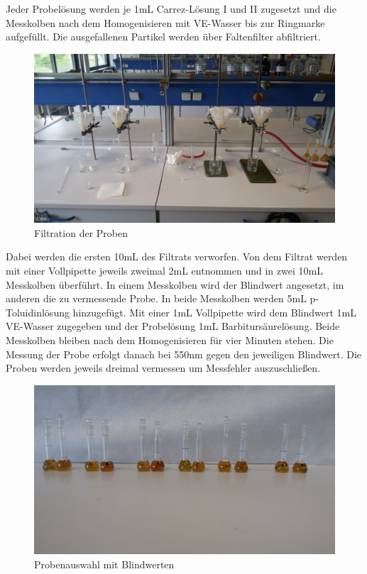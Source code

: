 Jeder Probelösung werden je 1mL Carrez-Lösung I und II zugesetzt und die Messkolben nach dem Homogenisieren mit VE-Wasser bis zur Ringmarke aufgefüllt. Die ausgefallenen Partikel werden über Faltenfilter abfiltriert. \\
\begin{figure}[htbp]
	\centering
		\includegraphics[width=1.00\textwidth]{../Bilder/20150427_131648.jpg}
	\caption{Filtration der Proben}
	\label{fig:Filtration}
\end{figure}
Dabei werden die ersten 10mL des Filtrats verworfen. Von dem Filtrat werden mit einer Vollpipette jeweils zweimal 2mL entnommen und in zwei 10mL Messkolben überführt. In einem Messkolben wird der Blindwert angesetzt, im anderen die zu vermessende Probe. In beide Messkolben werden 5mL p-Toluidinlösung hinzugefügt. Mit einer 1mL Vollpipette wird dem Blindwert 1mL VE-Wasser zugegeben und der Probelösung 1mL Barbitursäurelösung. Beide Messkolben bleiben nach dem Homogenisieren für vier Minuten stehen. Die Messung der Probe erfolgt danach bei 550nm gegen den jeweiligen Blindwert. Die Proben werden jeweils dreimal vermessen um Messfehler auszuschließen.
\begin{figure}[htbp]
	\centering
		\includegraphics[width=1.00\textwidth]{../Bilder/20150427_140221(0).jpg}
	\caption{Probenauswahl mit Blindwerten}
	\label{fig:Probenauswahl}
\end{figure}


